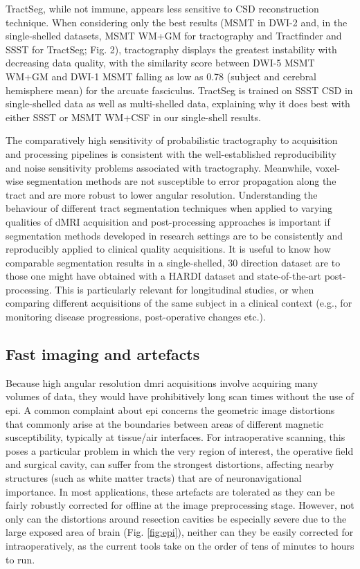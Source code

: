 TractSeg, while not immune, appears less sensitive to CSD reconstruction technique.
When considering only the best results (MSMT in DWI-2 and, in the single-shelled datasets, MSMT WM+GM for tractography and Tractfinder and SSST for TractSeg; Fig. 2), tractography displays the greatest instability with decreasing data quality, with the similarity score between DWI-5 MSMT WM+GM and DWI-1 MSMT falling as low as 0.78 (subject and cerebral hemisphere mean) for the arcuate fasciculus.
TractSeg is trained on SSST CSD in single-shelled data as well as multi-shelled data, explaining why it does best with either SSST or MSMT WM+CSF in our single-shell results.

The comparatively high sensitivity of probabilistic tractography to acquisition and processing pipelines is consistent with the well-established reproducibility and noise sensitivity problems associated with tractography.
Meanwhile, voxel-wise segmentation methods are not susceptible to error propagation along the tract and are more robust to lower angular resolution.
Understanding the behaviour of different tract segmentation techniques when applied to varying qualities of dMRI acquisition and post-processing approaches is important if segmentation methods developed in research settings are to be consistently and reproducibly applied to clinical quality acquisitions.
It is useful to know how comparable segmentation results in a single-shelled, 30 direction dataset are to those one might have obtained with a HARDI dataset and state-of-the-art post-processing.
This is particularly relevant for longitudinal studies, or when comparing different acquisitions of the same subject in a clinical context (e.g., for monitoring disease progressions, post-operative changes etc.).

\subsection{Fast imaging and artefacts}

Because high angular resolution \gls{dmri} acquisitions involve acquiring many volumes of data, they would have prohibitively long scan times without the use of \gls{epi}.
A common complaint about \gls{epi} concerns the geometric image distortions that commonly arise at the boundaries between areas of different magnetic susceptibility, typically at tissue/air interfaces.
For intraoperative scanning, this poses a particular problem in which the very region of interest, the operative field and surgical cavity, can suffer from the strongest distortions, affecting nearby structures (such as white matter tracts) that are of neuronavigational importance.\autocite{Yang2022}
In most applications, these artefacts are tolerated as they can be fairly robustly corrected for offline at the image preprocessing stage.
However, not only can the distortions around resection cavities be especially severe due to the large exposed area of brain (Fig. \ref{fig:epi}), neither can they be easily corrected for intraoperatively, as the current tools take on the order of tens of minutes to hours to run.

